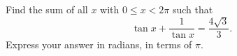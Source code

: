 Find the sum of all $x$ with $0\le x<2\pi$ such that
\[\tan x+\dfrac{1}{\tan x}=\dfrac{4\sqrt3}{3}.\]
Express your answer in radians, in terms of $\pi$.

